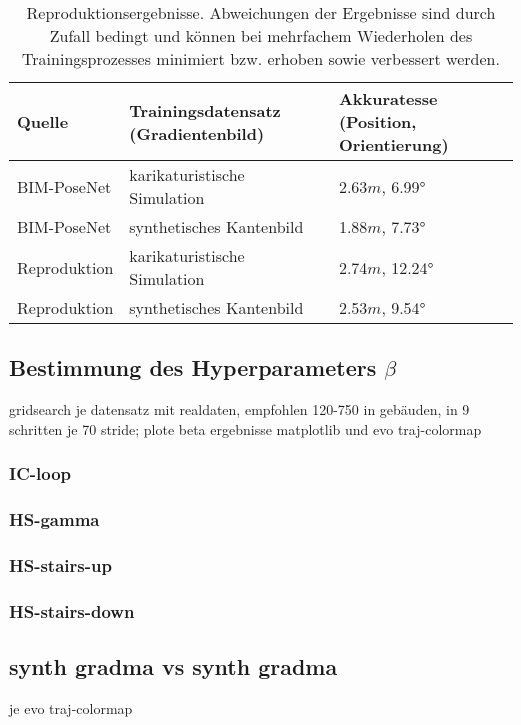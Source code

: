 \begin{table}[H]
	\centering
	\caption{Reproduktionsergebnisse. Abweichungen der Ergebnisse sind durch Zufall bedingt und können bei mehrfachem Wiederholen des Trainingsprozesses minimiert bzw. erhoben sowie verbessert werden. }
	\begin{tabularx}{1.0\textwidth}{>{\hsize=0.7\hsize}X >{\hsize=1.3\hsize}X X}
		\textbf{Quelle} & \textbf{Trainingsdatensatz} \hspace{2cm} (Gradientenbild)& \textbf{Akkuratesse} \hspace{2cm} (Position, Orientierung)\\
		\hline
		BIM-PoseNet & karikaturistische Simulation & 2.63$m$, 6.99°\\
		\hline
		BIM-PoseNet & synthetisches Kantenbild & 1.88$m$, 7.73°\\
		\hline
		Reproduktion & karikaturistische Simulation & 2.74$m$, 12.24°\\
		\hline
		Reproduktion & synthetisches Kantenbild & 2.53$m$, 9.54°\\
	\end{tabularx}
	\label{tab:reproduction}
\end{table}



\subsection{Bestimmung des Hyperparameters $\beta$}
\label{subsec:determine_beta}
gridsearch je datensatz mit realdaten, empfohlen 120-750 in gebäuden, in 9 schritten je 70 stride; plote beta ergebnisse matplotlib und evo traj-colormap
\subsubsection{IC-loop}
\subsubsection{HS-gamma}
\subsubsection{HS-stairs-up}
\subsubsection{HS-stairs-down}

\subsection{synth gradma vs synth gradma}
je evo traj-colormap
